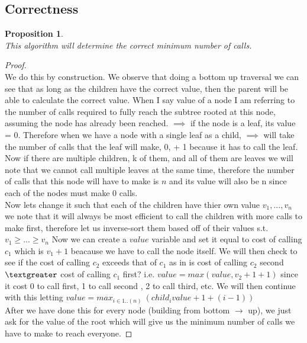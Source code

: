 \documentclass[12pt]{article}
\newtheorem{proposition}[theorem]{Proposition}
\begin{document}
\newpage
\subsection{Correctness}
\begin{proposition}
~ \\ \indent This algorithm will determine the correct minimum number of calls.
\end{proposition}

\begin{proof}
~ \\ \indent We do this by construction. We observe that doing a bottom up traversal we can
see that as long as the children have the correct value, then the parent will be able to
calculate the correct value. When I say value of a node I am referring to the number
of calls required to fully reach the subtree rooted at this node, assuming the node has
already been reached. $\implies$ if the node is a leaf, its value = 0. Therefore when we have
a node with a single leaf as a child, $\implies$ will take the number of calls that the
leaf will make, 0, + 1 because it has to call the leaf. Now if there are multiple children,
k of them, and all of them are leaves we will note that we cannot call multiple leaves at
the same time, therefore the number of calls that this node will have to make is $n$ and
its value will also be n since each of the nodes must make 0 calls. \\
\indent Now lets change it such that each of the children have thier own value $v_1,...,v_n$
we note that it will always be most efficient to call the children with more calls to make
first, therefore let us inverse-sort them based off of their values s.t. $v_1\geq...\geq v_n$
Now we can create a $value$ variable and set it equal to cost of calling $c_1$ which is
$v_1 + 1$ beacause we have to call the node itself. We will then check to see if the cost of calling
$c_2$ exceeds that of $c_1$ as in is cost of calling $c_2$ second $\textgreater$ cost of calling
$c_1$ first? i.e. $value = max(value, v_2 + 1 + 1)$ since it cost 0 to call first, 1
to call second , 2 to call third, etc. We will then continue with this letting
$value = max_{i \in 1..(n)}\ (child_{i}value + 1 + (i-1))$ \\
\indent After we have done this for every node (building from bottom $\rightarrow$ up), we
just ask for the value of the root which will give us the minimum number of calls we
have to make to reach everyone.
\end{proof}
\end{document}
